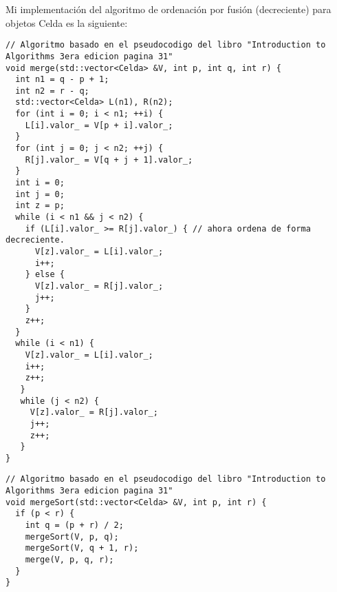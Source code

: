 Mi implementación del algoritmo de ordenación por fusión (decreciente) para objetos Celda es la siguiente:
\begin{lstlisting}
// Algoritmo basado en el pseudocodigo del libro "Introduction to Algorithms 3era edicion pagina 31"
void merge(std::vector<Celda> &V, int p, int q, int r) {
  int n1 = q - p + 1;
  int n2 = r - q;
  std::vector<Celda> L(n1), R(n2);
  for (int i = 0; i < n1; ++i) {
    L[i].valor_ = V[p + i].valor_;
  }
  for (int j = 0; j < n2; ++j) {
    R[j].valor_ = V[q + j + 1].valor_;
  }
  int i = 0;
  int j = 0;
  int z = p;
  while (i < n1 && j < n2) {
    if (L[i].valor_ >= R[j].valor_) { // ahora ordena de forma decreciente.
      V[z].valor_ = L[i].valor_;
      i++;
    } else {
      V[z].valor_ = R[j].valor_;
      j++;
    }
    z++;
  }
  while (i < n1) {
    V[z].valor_ = L[i].valor_;
    i++;
    z++;
   }
   while (j < n2) {
     V[z].valor_ = R[j].valor_;
     j++;
     z++;
   }
}
\end{lstlisting}

\begin{lstlisting}
// Algoritmo basado en el pseudocodigo del libro "Introduction to Algorithms 3era edicion pagina 31"
void mergeSort(std::vector<Celda> &V, int p, int r) {
  if (p < r) {
    int q = (p + r) / 2;
    mergeSort(V, p, q);
    mergeSort(V, q + 1, r);
    merge(V, p, q, r);
  }
}
\end{lstlisting}